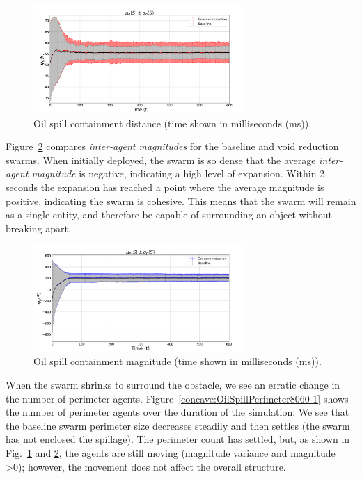 \documentclass[letterpaper]{article}
\begin{document}
 \begin{figure}
 \begin{center}
 \includegraphics[width=8cm]{figures/OilSpillPerimeter8060-DIST-1}
 \end{center}
 \caption{Oil spill containment distance (time shown in milliseconds (ms)). \label{concave:OilSpillPerimeter8060-DIST-1}}
 \end{figure}

Figure~\ref{concave:OilSpillPerimeter8060-MAG-1} compares \textit{inter-agent magnitudes} for the baseline and void reduction swarms. When initially deployed, the swarm is so dense that the average \textit{inter-agent magnitude} is negative, indicating a high level of expansion. Within 2 seconds the expansion has reached a point where the average magnitude is positive, indicating the swarm is cohesive. This means that the swarm will remain as a single entity, and therefore be capable of surrounding an object without breaking apart.

 \begin{figure}
 \begin{center}
 \includegraphics[width=8cm]{figures/OilSpillPerimeter8060-MAG-1}
 \end{center}
 \caption{Oil spill containment magnitude (time shown in milliseconds (ms)). \label{concave:OilSpillPerimeter8060-MAG-1}}
 \end{figure}

When the swarm shrinks to surround the obstacle, we see an erratic change in the number of perimeter agents. Figure~\ref{concave:OilSpillPerimeter8060-1} shows the number of perimeter agents over the duration of the simulation. We see that the baseline swarm perimeter size decreases steadily and then settles (the swarm has not enclosed the spillage). The perimeter count has settled, but, as shown in Fig.~\ref{concave:OilSpillPerimeter8060-DIST-1} and \ref{concave:OilSpillPerimeter8060-MAG-1}, the agents are still moving (magnitude variance and magnitude \textgreater 0); however, the movement does not affect the overall structure. 
\end{document}
